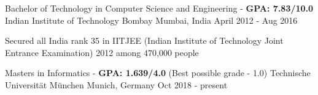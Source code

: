 \begin{cventries}
  	\cventry
    {Bachelor of Technology in Computer Science and Engineering - \textbf{GPA: 7.83/10.0}} %
    {Indian Institute of Technology Bombay} %
    {Mumbai, India} %
    {April 2012 - Aug 2016} %
    {
		\begin{cvitems}
			\item {Secured all India rank 35 in IITJEE (Indian Institute of Technology Joint Entrance Examination) 2012 among 470,000 people}
		\end{cvitems}
    }
	\cventry
	{Masters in Informatics - \textbf{GPA: 1.639/4.0} (Best possible grade - 1.0)} %
	{Technische Universität München} %
	{Munich, Germany} %
	{Oct 2018 - present} %
	{}
\end{cventries}
